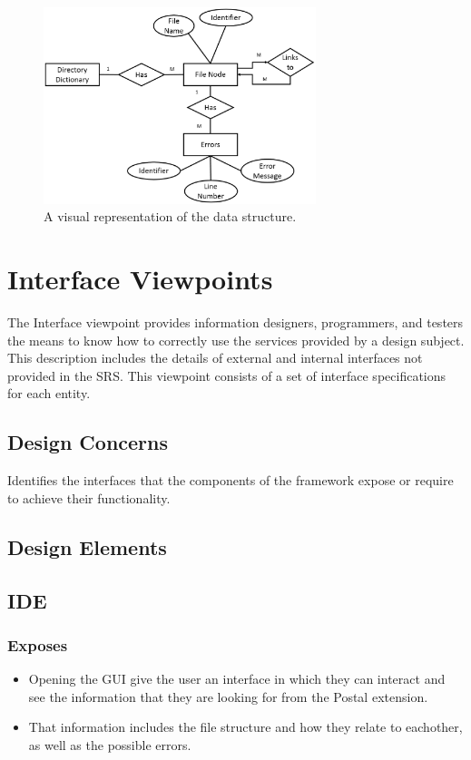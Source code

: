 \documentclass[letterpaper,10pt,titlepage,draftclsnofoot,onecolumn,onesided] {IEEEtran}
\begin{document}
	\begin{figure}
        \includegraphics[width=300px]{InformationERDEPS.eps}
        \caption{A visual representation of the data structure.}
    \end{figure}
		
		
		
\section{Interface Viewpoints}
The Interface viewpoint provides information designers, programmers, and testers the means to know how
to correctly use the services provided by a design subject. This description includes the details of external
and internal interfaces not provided in the SRS. This viewpoint consists of a set of interface specifications
for each entity. 
\subsection{Design Concerns}
Identifies the interfaces that the components of the framework expose or require to achieve their
functionality. 
\subsection{Design Elements}


	\subsection{IDE}
		\subsubsection{Exposes}
			\begin{itemize}
			\item Opening the GUI give the user an interface in which they can interact and see the information that they are looking for from the Postal extension.
			\item That information includes the file structure and how they relate to eachother, as well as the possible errors. 
			\end{itemize}
\end{document}
